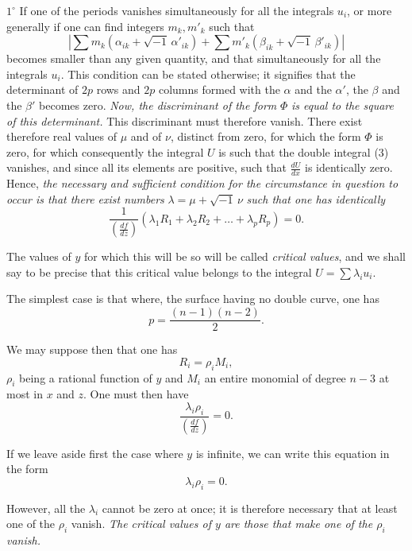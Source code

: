 \documentclass{article}
\begin{document}
$1^\circ$ If one of the periods vanishes simultaneously for all the integrals $u_{i}$, or more generally if one can find integers $m_{k}, m'_{k}$ such that
\[
\left| \sum m_{k} (\alpha_{ik} + \sqrt{-1}\,\alpha'_{ik}) + \sum m'_{k} (\beta_{ik} + \sqrt{-1}\,\beta'_{ik}) \right|
\]
becomes smaller than any given quantity, and that simultaneously for all the integrals $u_{i}$. This condition can be stated otherwise; it signifies that the determinant of $2p$ rows and $2p$ columns formed with the $\alpha$ and the $\alpha'$, the $\beta$ and the $\beta'$ becomes zero. \emph{Now, the discriminant of the form} $\Phi$ \emph{is equal to the square of this determinant.} This discriminant must therefore vanish. There exist therefore real values of $\mu$ and of $\nu$, distinct from zero, for which the form $\Phi$ is zero, for which consequently the integral $U$ is such that the double integral (3) vanishes, and since all its elements are positive, such that $\frac{dU}{dx}$ is identically zero. Hence, \emph{the necessary and sufficient condition for the circumstance in question to occur is that there exist numbers} $\lambda = \mu + \sqrt{-1}\,\nu$ \emph{such that one has identically}
\[
\frac{1}{\left(\frac{df}{dz}\right)} (\lambda_{1} R_{1} + \lambda_{2} R_{2} + \ldots + \lambda_{p} R_{p}) = 0.
\]

The values of $y$ for which this will be so will be called \emph{critical values}, and we shall say to be precise that this critical value belongs to the integral $U = \displaystyle\sum \lambda_{i} u_{i}$.

The simplest case is that where, the surface having no double curve, one has
\[
p = \frac{(n - 1)(n - 2)}{2}.
\]

We may suppose then that one has
\[
R_{i} = \rho_{i} M_{i},
\]
$\rho_{i}$ being a rational function of $y$ and $M_{i}$ an entire monomial of degree
$n - 3$ at most in $x$ and $z$. One must then have
\[
\frac{\lambda_{i} \rho_{i}}{\left(\frac{df}{dz}\right)} = 0.
\]

If we leave aside first the case where $y$ is infinite, we can write this equation in the form
\[
\lambda_{i} \rho_{i} = 0.
\]

However, all the $\lambda_{i}$ cannot be zero at once; it is therefore necessary that at least one of the $\rho_{i}$ vanish. \emph{The critical values of $y$ are those that make one of the $\rho_{i}$ vanish.}
\end{document}

